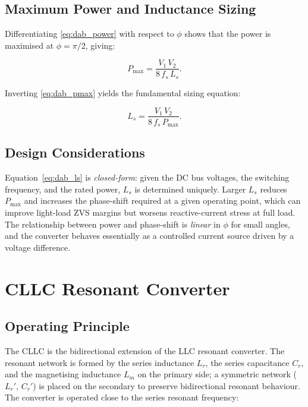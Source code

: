 \documentclass[a4paper, 11pt]{article}
\begin{document}
\subsection{Maximum Power and Inductance Sizing}

Differentiating \eqref{eq:dab_power} with respect to $\phi$ shows that
the power is maximised at $\phi = \pi/2$, giving:

\begin{equation}
  P_{\max} = \frac{V_1 \, V_2}{8\, f_s\, L_s}.
  \label{eq:dab_pmax}
\end{equation}

Inverting \eqref{eq:dab_pmax} yields the fundamental sizing equation:

\begin{equation}
  \boxed{L_s = \frac{V_1 \, V_2}{8\, f_s\, P_{\max}}.}
  \label{eq:dab_ls}
\end{equation}

\subsection{Design Considerations}

Equation~\eqref{eq:dab_ls} is \emph{closed-form}: given the DC bus
voltages, the switching frequency, and the rated power, $L_s$ is
determined uniquely.  Larger $L_s$ reduces $P_{\max}$ and increases
the phase-shift required at a given operating point, which can
improve light-load ZVS margins but worsens reactive-current stress at
full load.  The relationship between power and phase-shift is
\emph{linear} in $\phi$ for small angles, and the converter behaves
essentially as a controlled current source driven by a voltage
difference.

\section{CLLC Resonant Converter}

\subsection{Operating Principle}

The CLLC is the bidirectional extension of the LLC resonant converter.
The resonant network is formed by the series inductance $L_r$,
the series capacitance $C_r$, and the magnetising inductance $L_m$ on
the primary side; a symmetric network ($L_r'$, $C_r'$) is placed on
the secondary to preserve bidirectional resonant behaviour.
The converter is operated close to the series resonant frequency:
\end{document}
